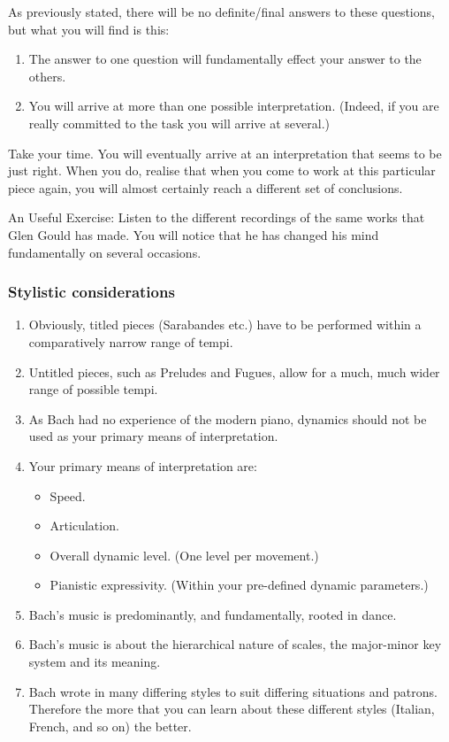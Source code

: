 \documentclass{article}
\begin{document}
As previously stated, there will be no definite/final answers to these questions, but what you will find is this:

\begin{enumerate}
    \item The answer to one question will fundamentally effect your answer to the others.
    \item You will arrive at more than one possible interpretation.
        (Indeed, if you are really committed to the task you will arrive at several.)
\end{enumerate}

Take your time.
You will eventually arrive at an interpretation that seems to be just right.
When you do, realise that when you come to work at this particular piece again, you will almost certainly reach a different set of conclusions.

An Useful Exercise: Listen to the different recordings of the same works that Glen Gould has made.
You will notice that he has changed his mind fundamentally on several occasions.

\subsubsection{Stylistic considerations}

\begin{enumerate}
    \item Obviously, titled pieces (Sarabandes etc.) have to be performed within a comparatively narrow range of tempi.
    \item Untitled pieces, such as Preludes and Fugues, allow for a much, much  wider range of possible tempi.
    \item As Bach had no experience of the modern piano, dynamics should not be used as your primary means of interpretation.
    \item Your primary means of interpretation are:
        \begin{itemize}
            \item Speed.
            \item Articulation.
            \item Overall dynamic level.
                (One level per movement.)
            \item Pianistic expressivity.
                (Within your pre-defined dynamic parameters.)
        \end{itemize}
    \item Bach's music is predominantly, and fundamentally, rooted in dance.
    \item Bach's music is about the hierarchical nature of scales, the major-minor key system and its meaning.
    \item Bach wrote in many differing styles to suit differing situations and patrons.
        Therefore the more that you can learn about these different styles (Italian, French, and so on) the better.
\end{enumerate}
\end{document}
